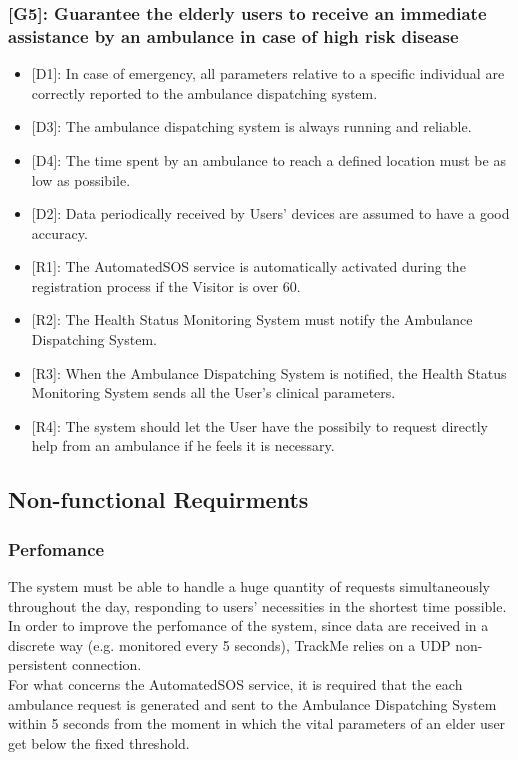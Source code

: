 \documentclass[12pt,a4paper]{article}
\begin{document}
	\subsubsection*{{[}{G5}{]}: Guarantee the elderly users to receive an immediate assistance by an ambulance in case of high risk disease}
	\begin{itemize}
 		\item {[D1]}: In case of emergency, all parameters relative to a specific individual are correctly reported to the ambulance dispatching system.
		\item {[D3]}: The ambulance dispatching system is always running and reliable.
		\item {[D4]}: The time spent by an ambulance to reach a defined location must be as low as possibile.
		\item {[D2]}: Data periodically received by Users' devices are assumed to have a good accuracy. 
		
		\item {[R1]}: The AutomatedSOS service is automatically activated during the registration process if the Visitor is over 60.
		\item {[R2]}: The Health Status Monitoring System must notify the Ambulance Dispatching System. 
		\item {[R3]}: When the Ambulance Dispatching System is notified, the Health Status Monitoring System sends all the User's clinical parameters.
		\item {[R4]}: The system should let the User have the possibily to request directly help from an ambulance if he feels it is necessary.
	\end{itemize}
	\subsection{Non-functional Requirments}
	\subsubsection{Perfomance}
	The system must be able to handle a huge quantity of requests simultaneously throughout the day, responding to users' necessities in the shortest time possible. In order to improve the perfomance of the system, since data are received in a discrete way (e.g. monitored every 5 seconds), TrackMe relies on a UDP non-persistent connection.\\
	For what concerns the AutomatedSOS service, it is required that the each ambulance request is generated and sent to the Ambulance Dispatching System within 5 seconds from the moment in which the vital parameters of an elder user get below the fixed threshold.
\end{document}
